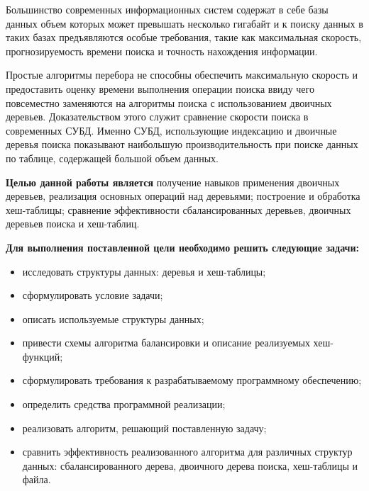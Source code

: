 \Introduction


Большинство  современных  информационных  систем  содержат  в  себе 
базы данных объем которых может превышать несколько гигабайт и к 
поиску  данных  в  таких  базах  предъявляются  особые  требования,  такие  как 
максимальная скорость, прогнозируемость времени поиска и точность 
нахождения информации.

Простые алгоритмы перебора не способны 
обеспечить максимальную скорость и предоставить оценку времени 
выполнения операции поиска ввиду чего повсеместно заменяются на 
алгоритмы  поиска  с  использованием  двоичных  деревьев.  Доказательством 
этого  служит  сравнение  скорости  поиска  в  современных  СУБД.  Именно 
СУБД,  использующие  индексацию  и  двоичные  деревья  поиска  показывают 
наибольшую производительность при поиске данных по таблице, 
содержащей большой объем данных. \cite{avl}

\textbf{Целью данной работы является} получение навыков применения двоичных деревьев, реализация основных операций над деревьями; построение и обработка хеш-таблицы; сравнение эффективности сбалансированных деревьев, двоичных деревьев поиска и хеш-таблиц.

\textbf{Для выполнения поставленной цели необходимо решить следующие задачи: }

\begin{itemize}[$\bullet$]
    \item исследовать структуры данных: деревья и хеш-таблицы;
    \item сформулировать условие задачи;
    \item описать используемые структуры данных;
    \item привести схемы алгоритма балансировки и описание реализуемых хеш-функций;
    \item сформулировать требования к разрабатываемому программному обеспечению;
    \item определить средства программной реализации;
    \item реализовать алгоритм, решающий поставленную задачу;
    \item сравнить эффективность реализованного алгоритма для различных структур данных: сбалансированного дерева, двоичного дерева поиска, хеш-таблицы и файла.
\end{itemize}
